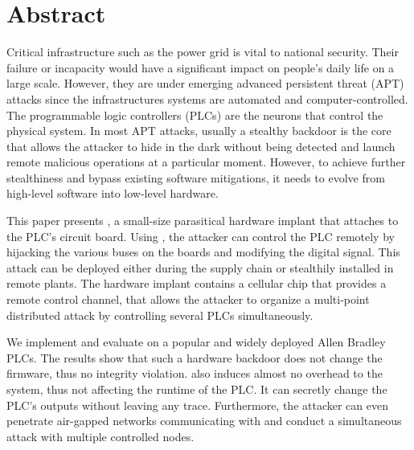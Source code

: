 \section{Abstract}
\label{sec:implant-abstract}


Critical infrastructure such as the power grid is vital to national security.
Their failure or incapacity would have a significant impact on people's daily life on a large scale. However, they are under emerging advanced persistent threat (APT) attacks since the infrastructures systems are automated and computer-controlled. The programmable logic controllers (PLCs) are the neurons that control the physical system. In most APT attacks, usually a stealthy backdoor is the core that allows the attacker to hide in the dark without being detected and launch remote malicious operations at a particular moment. However, to achieve further stealthiness and bypass existing software mitigations, it needs to evolve from high-level software into low-level hardware.

This paper presents \name, a small-size parasitical hardware implant that attaches to the PLC's circuit board. Using \name, the attacker can control the PLC remotely by hijacking the various buses on the boards and modifying the digital signal. This attack can be deployed either during the supply chain or stealthily installed in remote plants. The hardware implant contains a cellular chip that provides a remote control channel, that allows the attacker to organize a multi-point distributed attack by controlling several PLCs simultaneously.

We implement and evaluate \name on a popular and widely deployed Allen Bradley PLCs. The results show that such a hardware backdoor does not change the firmware, thus no integrity violation. \name also induces almost no overhead to the system, thus not affecting the runtime of the PLC. It can secretly change the PLC's outputs without leaving any trace. Furthermore, the attacker can even penetrate air-gapped networks communicating with \name and conduct a simultaneous attack with multiple controlled nodes.

